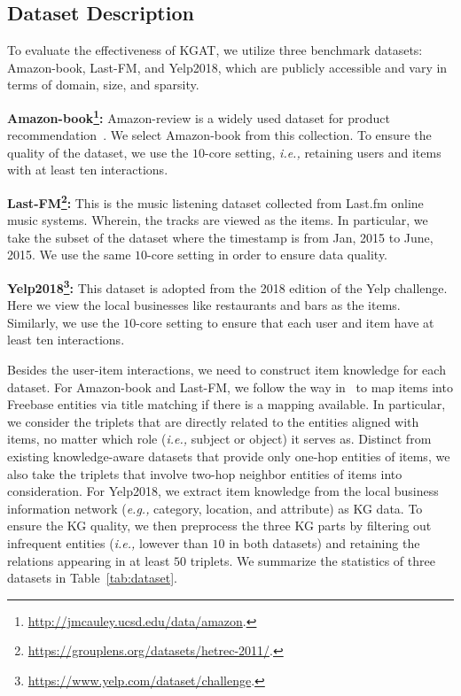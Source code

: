 \documentclass[sigconf]{acmart}
\newcommand{\ie}{\emph{i.e., }}
\newcommand{\eg}{\emph{e.g., }}
\theoremstyle{definition}
\begin{document}
\subsection{Dataset Description}

To evaluate the effectiveness of KGAT, we utilize three benchmark datasets: Amazon-book, Last-FM, and Yelp2018, which are publicly accessible and vary in terms of domain, size, and sparsity.


\vspace{2px}
\noindent\textbf{Amazon-book\footnote{\url{http://jmcauley.ucsd.edu/data/amazon}.}:}
Amazon-review is a widely used dataset for product recommendation~\cite{amazon-review}.
We select Amazon-book from this collection.
To ensure the quality of the dataset, we use the $10$-core setting, \ie retaining users and items with at least ten interactions.

\vspace{2px}
\noindent\textbf{Last-FM\footnote{\url{https://grouplens.org/datasets/hetrec-2011/}.}:}
This is the music listening dataset collected from Last.fm online music systems.
Wherein, the tracks are viewed as the items.
In particular, we take the subset of the dataset where the timestamp is from Jan, 2015 to June, 2015.
We use the same $10$-core setting in order to ensure data quality.

\vspace{2px}
\noindent\textbf{Yelp2018\footnote{\url{https://www.yelp.com/dataset/challenge}.}:}
This dataset is adopted from the 2018 edition of the Yelp challenge.
Here we view the local businesses like restaurants and bars as the items.
Similarly, we use the $10$-core setting to ensure that each user and item have at least ten interactions.

Besides the user-item interactions, we need to construct item knowledge for each dataset.
For Amazon-book and Last-FM, we follow the way in~\cite{KB4Rec} to map items into Freebase entities via title matching if there is a mapping available.
In particular, we consider the triplets that are directly related to the entities aligned with items, no matter which role (\ie subject or object) it serves as.
Distinct from existing knowledge-aware datasets that provide only one-hop entities of items, we also take the triplets that involve two-hop neighbor entities of items into consideration.
For Yelp2018, we extract item knowledge from the local business information network (\eg category, location, and attribute) as KG data.
To ensure the KG quality, we then preprocess the three KG parts by filtering out infrequent entities (\ie lowever than $10$ in both datasets) and retaining the relations appearing in at least $50$ triplets.
We summarize the statistics of three datasets in Table~\ref{tab:dataset}.
\end{document}
